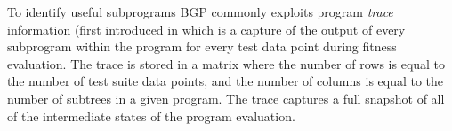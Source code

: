 To identify useful subprograms BGP commonly exploits program \textit{trace} information (first introduced in \cite{krawiec2013pattern} which is a capture of the output of every subprogram within the program for every test data point during fitness evaluation.  %
%
%
The trace is stored in a matrix where the number of rows is equal to the number of test suite data points, and the number of columns is equal to the number of subtrees in a given program. %
The trace captures a full snapshot of all of the intermediate states of the program evaluation. 

